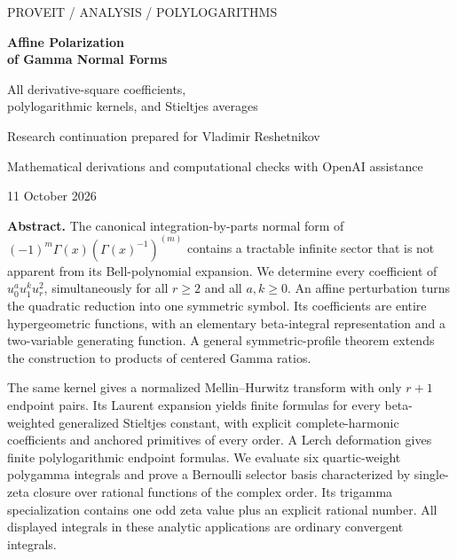 \documentclass[11pt,letterpaper]{article}
\numberwithin{equation}{section}
\theoremstyle{definition}\newtheorem{definition}[theorem]{Definition}
\theoremstyle{remark}\newtheorem{remark}[theorem]{Remark}
\begin{document}
\hypersetup{pageanchor=false}
\begin{titlepage}
\centering
\vspace*{0.7cm}
{\large\sffamily PROVEIT / ANALYSIS / POLYLOGARITHMS\par}
\vspace{1.1cm}
{\Huge\bfseries Affine Polarization\\[0.15em] of Gamma Normal Forms\par}
\vspace{0.7cm}
{\Large All derivative-square coefficients,\\[0.2em]
polylogarithmic kernels, and Stieltjes averages\par}
\vspace{0.8cm}
{\large Research continuation prepared for Vladimir Reshetnikov\par}
\vspace{0.25cm}
{Mathematical derivations and computational checks with OpenAI assistance\par}
\vspace{0.25cm}
{11 October 2026\par}
\vspace{0.7cm}
\begin{minipage}{0.93\textwidth}
\small
\textbf{Abstract.}
The canonical integration-by-parts normal form of
$(-1)^m\Gamma(x)(\Gamma(x)^{-1})^{(m)}$ contains a tractable infinite
sector that is not apparent from its Bell-polynomial expansion.
We determine every coefficient of $u_0^a u_1^k u_r^2$, simultaneously
for all $r\ge2$ and all $a,k\ge0$. An affine perturbation turns the
quadratic reduction into one symmetric symbol. Its coefficients are
entire hypergeometric functions, with an elementary beta-integral
representation and a two-variable generating function. A general
symmetric-profile theorem extends the construction to products of
centered Gamma ratios.

The same kernel gives a normalized Mellin--Hurwitz transform with only
$r+1$ endpoint pairs. Its Laurent expansion yields finite formulas for
every beta-weighted generalized Stieltjes constant, with explicit
complete-harmonic coefficients and anchored primitives of every order.
A Lerch deformation gives finite polylogarithmic endpoint formulas.
We evaluate six quartic-weight polygamma integrals and prove a
Bernoulli selector basis characterized by single-zeta closure over rational
functions of the complex order. Its trigamma specialization contains one
odd zeta value plus an explicit rational number. All displayed integrals in these analytic
applications are ordinary convergent integrals.


\end{minipage}
\end{titlepage}
\end{document}
